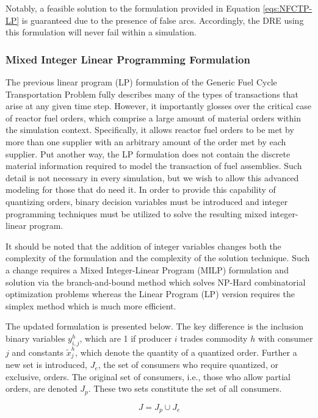 Notably, a feasible solution to the formulation provided in Equation
\ref{eqs:NFCTP-LP} is guaranteed due to the presence of false arcs. Accordingly,
the DRE using this formulation will never fail within a simulation.

\subsubsection{Mixed Integer Linear Programming Formulation}\label{abm:dre:milp}

The previous linear program (LP) formulation of the Generic Fuel Cycle
Transportation Problem fully describes many of the types of transactions that
arise at any given time step. However, it importantly glosses over the critical
case of reactor fuel orders, which comprise a large amount of material orders
within the simulation context. Specifically, it allows reactor fuel orders to be
met by more than one supplier with an arbitrary amount of the order met by each
supplier. Put another way, the LP formulation does not contain the discrete
material information required to model the transaction of fuel assemblies. Such
detail is not necessary in every simulation, but we wish to allow this advanced
modeling for those that do need it. In order to provide this capability of
quantizing orders, binary decision variables must be introduced and integer
programming techniques must be utilized to solve the resulting mixed
integer-linear program. 

It should be noted that the addition of integer variables changes both the
complexity of the formulation and the complexity of the solution technique. Such
a change requires a Mixed Integer-Linear Program (MILP) formulation and solution
via the branch-and-bound method which solves NP-Hard combinatorial optimization
problems whereas the Linear Program (LP) version requires the simplex method
which is much more efficient.

The updated formulation is presented below. The key difference is the inclusion
binary variables $y_{i,j}^{h}$, which are 1 if producer $i$ trades commodity $h$
with consumer $j$ and constants $\tilde{x}_{j}^{h}$, which denote the quantity
of a quantized order. Further a new set is introduced, $J_{e}$, the set of
consumers who require quantized, or exclusive, orders. The original set of
consumers, i.e., those who allow partial orders, are denoted $J_{p}$. These two
sets constitute the set of all consumers.

\begin{equation}\label{eqs:consumer-union}
  J = J_{p} \cup J_{e}
\end{equation}

